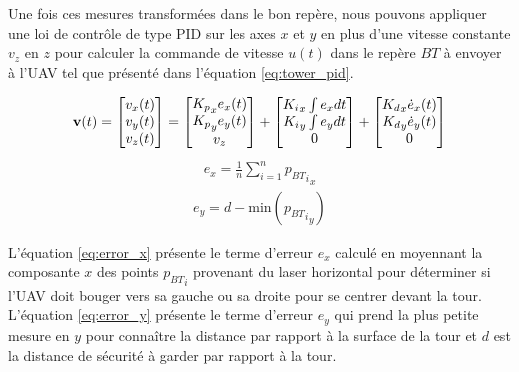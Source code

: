 Une fois ces mesures transformées dans le bon repère, nous pouvons appliquer une loi de contrôle de type PID sur les axes $x$ et $y$ en plus d'une vitesse constante $v_z$ en $z$ pour calculer la commande de vitesse $u(t)$ dans le repère ${BT}$ à envoyer à l'UAV tel que présenté dans l'équation \ref{eq:tower_pid}.

\begin{align}
  \mathbf{v}(t) = \begin{bmatrix}v_x(t)\\ v_y(t)\\ v_z(t)\end{bmatrix} =
  \begin{bmatrix}{K_p}_x e_x(t)\\ {K_p}_y e_y(t)\\ v_z\end{bmatrix} +
  \begin{bmatrix}{K_i}_x \int e_x dt\\ {K_i}_y \int e_y dt\\ 0\end{bmatrix} +
  \begin{bmatrix}{K_d}_x \dot{e}_x(t)\\ {K_d}_y \dot{e}_y(t)\\ 0\end{bmatrix}
  \label{eq:tower_pid}
\end{align}
\begin{align}
  e_x = \frac{1}{n} \sum_{i = 1}^n {{p_{BT}}_i}_x
  \label{eq:error_x}
\end{align}
\begin{align}
  e_y = d - {\text{min}}({{p_{BT}}_i}_y)
  \label{eq:error_y}
\end{align}

L'équation \ref{eq:error_x} présente le terme d'erreur $e_x$ calculé en moyennant la composante $x$ des points ${p_{BT}}_i$ provenant du laser horizontal pour déterminer si l'UAV doit bouger vers sa gauche ou sa droite pour se centrer devant la tour. L'équation \ref{eq:error_y} présente le terme d'erreur $e_y$ qui prend la plus petite mesure en $y$ pour connaître la distance par rapport à la surface de la tour et $d$ est la distance de sécurité à garder par rapport à la tour.

